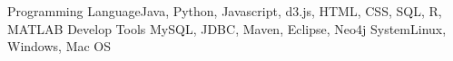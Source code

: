 
\begin{cvskills}
  \cvskill
  {Programming Language}{Java, Python, Javascript, d3.js, HTML, CSS, SQL, R, MATLAB}
  \cvskill
  {Develop Tools}{ MySQL, JDBC, Maven, Eclipse,  Neo4j}
  \cvskill
  {System}{Linux, Windows, Mac OS}
\end{cvskills}